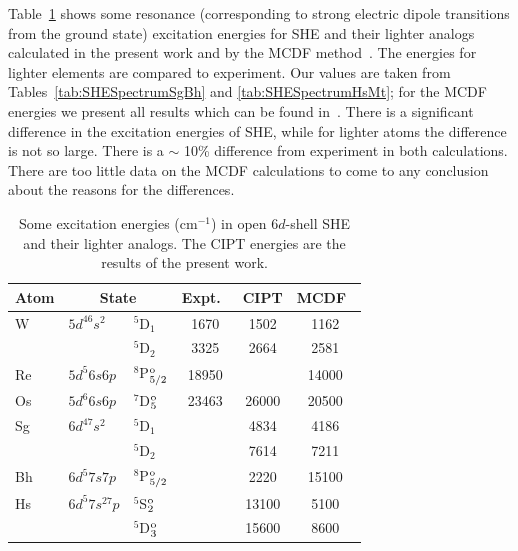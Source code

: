 \documentclass[8pt,a4paper, twoside]{report}
\begin{document}
Table~\ref{tab:EE} shows some resonance (corresponding to strong electric dipole transitions from the ground state) excitation energies for SHE and their lighter analogs calculated in the present work and by the MCDF method~\cite{MCDF-Sg,MCDF-BhHs}. The energies for lighter elements are compared to experiment. Our values are taken from Tables~\ref{tab:SHESpectrumSgBh} and \ref{tab:SHESpectrumHsMt}; for the MCDF energies we present all results which can be found in~\cite{MCDF-Sg,MCDF-BhHs}. There is  a significant difference in the excitation energies of SHE, while for lighter atoms the difference is not so large. There is a $\sim$ 10\% difference from experiment in both calculations. There are too little data on the MCDF calculations to come to any conclusion about the reasons for the differences. %
\begin{table}[h]
\caption{Some excitation energies (cm$^{-1}$) in open $6d$-shell SHE and their lighter analogs. The CIPT energies are the results of the present work.   \label{tab:EE}}
\begin{tabular}{lllccc}
\toprule
\toprule
Atom &  \multicolumn{2}{c}{State} &  Expt.~\cite{NIST_ASD}   & CIPT  & MCDF~\cite{MCDF-Sg,MCDF-BhHs} \\
\midrule

W  & $5d^46s^2$ & $^5$D$_1$ & 1670 &1502 & 1162 \\
      &                      & $^5$D$_2$ & 3325 & 2664 & 2581 \\

Re    & $5d^5 6s6p$ &  $^8$P$^{\rm o}_{5/2}$   &  18950  &    & 14000  \\

Os    & $5d^6 6s6p$ &  $^7$D$^{\rm o}_{5}$  & 23463  &  26000  &  20500 \\

Sg  & $6d^47s^2$ & $^5$D$_1$ &         &4834 & 4186 \\
      &                      & $^5$D$_2$ &        & 7614 & 7211 \\

Bh    & $6d^5 7s7p$ &  $^8$P$^{\rm o}_{5/2}$   &    & 2220   & 15100  \\

Hs    & $6d^5 7s^27p$ &  $^5$S$^{\rm o}_{2}$  &   &  13100  &  5100 \\
        &                           &  $^5$D$^{\rm o}_{3}$  &   &  15600  &  8600 \\

\bottomrule
\bottomrule
\end{tabular}
\end{table}
\end{document}
